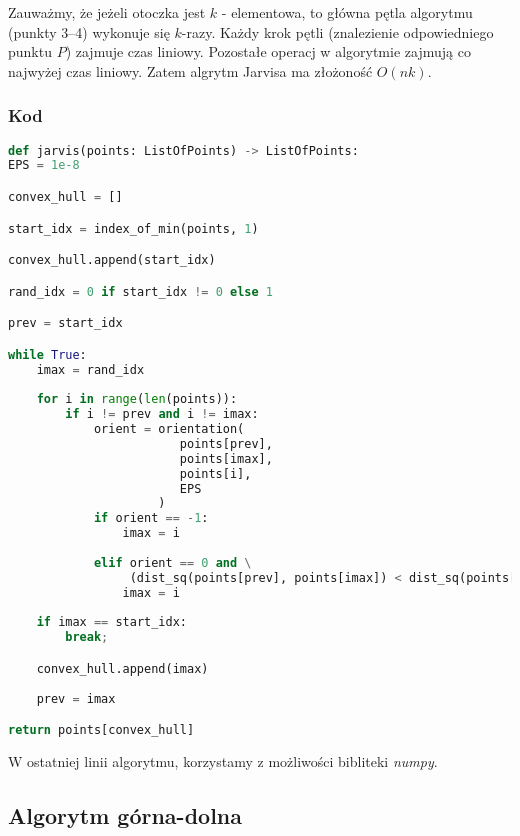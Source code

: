 \documentclass[11pt]{article}
\theoremstyle{remark} \newtheorem{definition}{def.}
\theoremstyle{definition} \newtheorem{twierdzenie}{tw.}
\begin{document}
    Zauważmy, że jeżeli otoczka jest $k$ - elementowa, to główna pętla algorytmu (punkty 3--4) wykonuje się $k$-razy. Każdy krok pętli (znalezienie odpowiedniego punktu $P$) zajmuje czas liniowy. 
    Pozostałe operacj w algorytmie zajmują co najwyżej czas liniowy. Zatem algrytm Jarvisa ma złożoność $O(nk)$.

    \subsubsection{Kod}

    \begin{lstlisting}[language=Python]
def jarvis(points: ListOfPoints) -> ListOfPoints:
EPS = 1e-8

convex_hull = []

start_idx = index_of_min(points, 1)

convex_hull.append(start_idx)

rand_idx = 0 if start_idx != 0 else 1

prev = start_idx

while True:
    imax = rand_idx
        
    for i in range(len(points)):
        if i != prev and i != imax:
            orient = orientation(
                        points[prev], 
                        points[imax], 
                        points[i], 
                        EPS
                     )
            if orient == -1:
                imax = i
                
            elif orient == 0 and \
                 (dist_sq(points[prev], points[imax]) < dist_sq(points[prev], points[i])):
                imax = i
                
    if imax == start_idx:
        break;

    convex_hull.append(imax)
    
    prev = imax

return points[convex_hull]
    \end{lstlisting}

    W ostatniej linii algorytmu, korzystamy z możliwości bibliteki \emph{numpy}.\\


\subsection{Algorytm górna-dolna}
\end{document}
